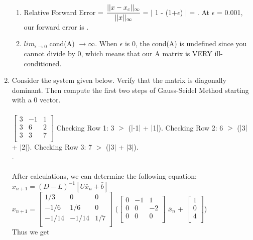 \documentclass[12pt]{article}
\begin{document}
\begin{enumerate}
\begin{enumerate}
\item Relative Forward Error = $\cfrac{||x - x_c||_{\infty}}{||x||_{\infty}}$ = $|$ 1 - (1+$\epsilon$) $|$ = \fbox{$\epsilon$}. At $\epsilon$ = 0.001, our forward error is .
\item $lim_{\epsilon \rightarrow 0}$ cond(A) $\rightarrow \infty$. When $\epsilon$ is 0, the cond(A) is undefined since you cannot divide by 0, which means that our A matrix is VERY ill-conditioned. \\
	\end{enumerate}
\item Consider the system given below. Verify that the matrix is diagonally dominant. Then compute the first two steps of Gauss-Seidel Method starting with a 0 vector. \\ \\
$\begin{bmatrix}
   3 & -1 & 1 \\
   3 & 6 & 2 \\
   3 & 3 & 7 \\
\end{bmatrix}$ \tabto{2.5cm} Checking Row 1: 3 $>$ ($|$-1$|$ + $|$1$|$). Checking Row 2: 6 $>$ ($|$3$|$ + $|$2$|$). 
\tabto{2.5cm} Checking Row 3: 7 $>$ ($|$3$|$ + $|$3$|$). \\
. \\ \\
After calculations, we can determine the following equation: \\
$x_{n+1} = (D-L)^{-1}[U\bar{x}_n + \bar{b}]$\\
$x_{n+1} = \begin{bmatrix}
   1/3 & 0 & 0 \\
   -1/6 & 1/6 & 0 \\
   -1/14 & -1/14 & 1/7 \\
\end{bmatrix}$ ($\begin{bmatrix}
   0 & -1 & 1 \\
   0 & 0 & -2 \\
   0 & 0 & 0 \\
\end{bmatrix}$ $\bar{x}_n$ + $\begin{bmatrix}
   1 \\
   0   \\
   4   \\
\end{bmatrix}$) \\ 
Thus we get 


\end{enumerate}
\end{document}
